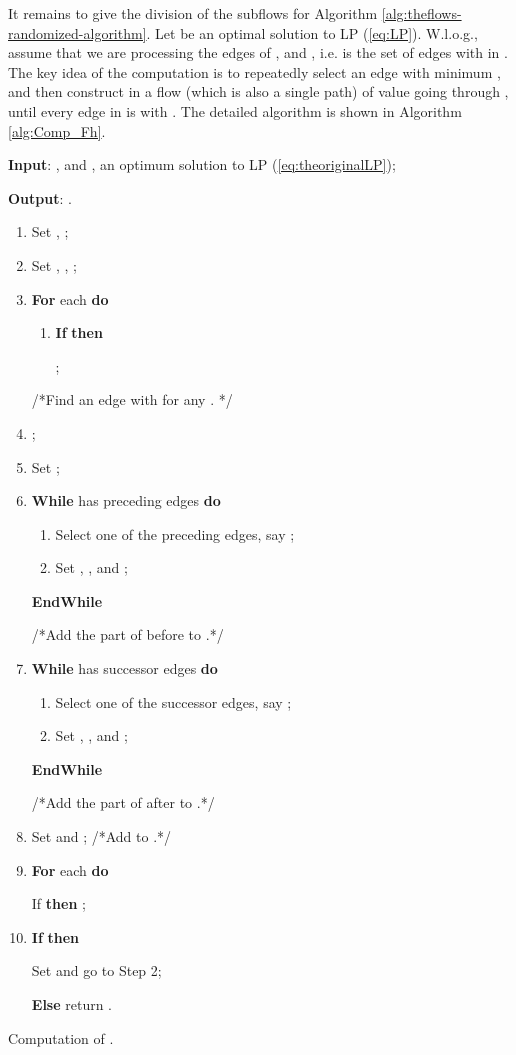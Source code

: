 \documentclass[11pt,english,onecolumn,draftcls]{IEEEtran}
\theoremstyle{plain}
\theoremstyle{plain}
\theoremstyle{plain}
\theoremstyle{plain}
\begin{document}
It remains to give the division of the subflows for Algorithm \ref{alg:theflows-randomized-algorithm}.
Let  be
an optimal solution to LP (\ref{eq:LP}). W.l.o.g., assume that we
are processing the edges of , and ,
i.e.  is the set of edges with  in .
The key idea of the computation is to repeatedly select an edge 
with minimum , and then construct in  a flow (which
is also a single path) of value  going through , until
every edge  in  is with . The detailed algorithm
is shown in Algorithm \ref{alg:Comp_Fh}.

\begin{algorithm}
\textbf{Input}: ,  and ,
an optimum solution to LP (\ref{eq:theoriginalLP});

\textbf{Output}: .
\begin{enumerate}
\item Set , ;
\item Set , , ;
\item \textbf{For }each  \textbf{do}

\begin{enumerate}
\item \textbf{If}  \textbf{then}


;

\end{enumerate}

/{*}Find an edge  with  for
any . {*}/

\item ;
\item Set ;
\item \textbf{While}  has preceding edges \textbf{do}

\begin{enumerate}
\item Select one of the preceding edges, say ;
\item Set , , and ;
\end{enumerate}

\textbf{EndWhile}


/{*}Add the part of  before  to .{*}/

\item \textbf{While}  has successor edges \textbf{do}

\begin{enumerate}
\item Select one of the successor edges, say ;
\item Set , , and ;
\end{enumerate}

\textbf{EndWhile}


/{*}Add the part of  after  to .{*}/

\item Set  and ;
/{*}Add  to .{*}/
\item \textbf{For} each  \textbf{do}


If  \textbf{then} ;

\item \textbf{If}  \textbf{then}


Set  and go to Step 2;


\textbf{Else} return .

\end{enumerate}
\protect\caption{\label{alg:Comp_Fh}Computation of .}
\end{algorithm}
\end{document}
